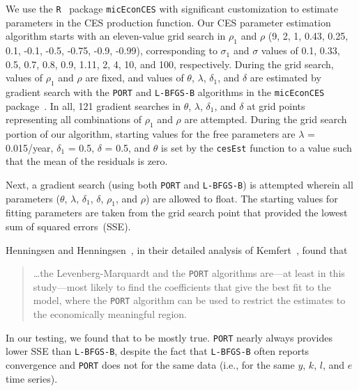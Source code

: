 \documentclass[preprint,10pt,3p]{elsarticle}\usepackage[]{graphicx}\usepackage[]{color}
\newcommand{\sse}{\mbox{SSE}}
\begin{document}
We use the \texttt{R}~\citep{R}
package \texttt{micEconCES}
\citep{Henningsen:2011td}
with significant customization
to estimate parameters in the CES production function.
Our CES parameter estimation algorithm starts with an eleven-value grid search
in $\rho_1$ and $\rho$
(9, 2, 1, 0.43, 0.25, 0.1, -0.1, -0.5, -0.75, -0.9, -0.99),
corresponding to $\sigma_1$ and $\sigma$ values of
0.1, 0.33, 0.5, 0.7, 0.8, 0.9, 1.11, 2, 4, 10, and 100,
respectively.
During the grid search, values of $\rho_1$ and $\rho$ are fixed,
and values of $\theta$, $\lambda$, $\delta_1$, and $\delta$ are estimated
by gradient search with the \texttt{PORT} and \texttt{L-BFGS-B} algorithms
in the \texttt{micEconCES} package~\citep{Henningsen:2011td}.
In all, 121 gradient searches in $\theta$, $\lambda$, $\delta_1$, and $\delta$
at grid points representing all combinations of $\rho_1$ and $\rho$ are
attempted.
During the grid search portion of our algorithm, starting values for the free
parameters
are $\lambda$ = 0.015/year, $\delta_1$ = 0.5, $\delta$ = 0.5,
and $\theta$ is set by the \texttt{cesEst} function
to a value such that the mean of the residuals is zero.

Next, a gradient search (using both \texttt{PORT} and \texttt{L-BFGS-B})
is attempted wherein all parameters
($\theta$, $\lambda$, $\delta_1$, $\delta$, $\rho_1$, and $\rho$)
are allowed to float.
The starting values for fitting parameters are taken from
the grid search point that provided the lowest sum of squared errors~(\sse).

Henningsen and Henningsen~\cite{Henningsen:2011td},
in their detailed analysis of Kemfert~\cite{kemfert1998estimated}, found that
%
\begin{quote}
\ldots the Levenberg-Marquardt and the \texttt{PORT} algorithms
are---at least in this study---most likely to find the
coefficients that give the best fit to the model,
where the \texttt{PORT} algorithm can be used to restrict the estimates
to the economically meaningful region.
\end{quote}
%
In our testing, we found that to be mostly true.
\texttt{PORT} nearly always provides lower
\sse{} than \texttt{L-BFGS-B}, despite the fact that
\texttt{L-BFGS-B} often reports convergence
and \texttt{PORT} does not for the same data
(i.e., for the same $y$, $k$, $l$, and $e$ time series).
\end{document}
